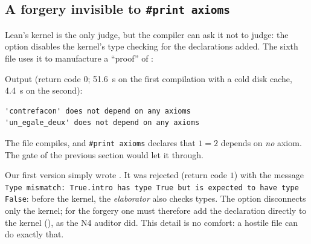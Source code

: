 \subsection{A forgery invisible to \texttt{\#print axioms}}
\begingroup\sloppy Lean's kernel is the only judge, but the compiler can ask it not to judge: the option 
disables the kernel's type checking for the declarations added. The sixth file uses it to manufacture a ``proof'' of
:\par\endgroup

\noindent Output (return code $0$; 51.6~s on the first compilation with a cold disk cache, 4.4~s on the second):
\begin{lstlisting}[style=appC,language={}]
'contrefacon' does not depend on any axioms
'un_egale_deux' does not depend on any axioms
\end{lstlisting}
The file compiles, and \texttt{\#print axioms} declares that $1=2$ depends on \emph{no} axiom. The gate of the previous
section would let it through.

\begin{remark}\sloppy
Our first version simply wrote . It was rejected (return code $1$) with the message \texttt{Type mismatch: True.intro has type True
but is expected to have type False}: before the kernel, the \emph{elaborator} also checks types. The option disconnects
only the kernel; for the forgery one must therefore add the declaration directly to the kernel (), as the
N4 auditor did. This detail is no comfort: a hostile file can do exactly that.
\end{remark}

